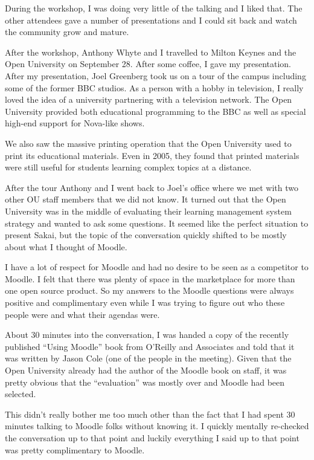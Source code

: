 \documentclass[12pt]{book}
\begin{document}
During the workshop, I was doing very little of
the talking and I liked that.  The other
attendees gave a number of presentations and I could
sit back and watch the community grow and mature.

After the workshop, Anthony Whyte and I
travelled to Milton Keynes and the Open University
on September 28.   After some coffee,
I gave my presentation.  After my presentation,
Joel Greenberg took us on a tour of
the campus including some of the former BBC studios.
As a person with a hobby in television, I really
loved the idea of a university partnering with
a television network.  The Open University provided
both educational programming to the BBC as well as special
high-end support for Nova-like shows.

We also saw the massive printing operation that
the Open University used to print its educational
materials.   Even in 2005, they found that printed
materials were still useful for students
learning complex topics at a distance.

After the tour Anthony and I went back to Joel's
office where we met with two other OU staff members that
we did not know.
It turned out that the Open University was in
the middle of evaluating their learning management
system strategy and wanted to ask some
questions.  It seemed like the perfect situation
to present Sakai, but the topic of the conversation
quickly shifted to be mostly about what I
thought of Moodle.

I have a lot of respect for Moodle and had no desire
to be seen as a competitor to Moodle.  I felt that there
was plenty of space in the marketplace for more than one
open source product.   So my answers to the Moodle
questions were always positive and complimentary
even while I was trying to figure out who these people
were and what their agendas were.

About 30 minutes into the conversation, I was handed
a copy of the recently published ``Using Moodle''
book from O'Reilly and Associates and told that
it was written by Jason Cole (one of the people
in the meeting).  Given that the Open University
already had the author of the Moodle book on
staff, it was pretty obvious that the
``evaluation'' was mostly over and Moodle had
been selected.

This didn't really bother me too much other than
the fact that I had spent 30 minutes talking
to Moodle folks without knowing it.  I quickly
mentally re-checked the conversation up to
that point and luckily everything I said up to
that point was pretty complimentary to Moodle.
\end{document}
